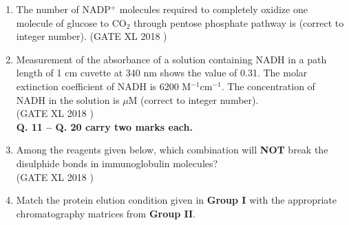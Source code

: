 \documentclass[14pt]{extarticle}
\begin{document}
\begin{flushleft}
\begin{enumerate}[leftmargin=*]
\item The number of NADP$^+$ molecules required to completely oxidize one molecule of glucose to CO$_2$ through pentose phosphate pathway is \underline{\hspace{2cm}} (correct to integer number).
\hfill(GATE XL 2018 )\\


\item Measurement of the absorbance of a solution containing NADH in a path length of 1 cm cuvette at 340 nm shows the value of 0.31. The molar extinction coefficient of NADH is 6200 M$^{-1}$cm$^{-1}$. The concentration of NADH in the solution is \underline{\hspace{2cm}} $\mu$M (correct to integer number).\\[2ex]
\hfill(GATE XL 2018 )\\


\textbf{Q. 11 – Q. 20 carry two marks each.}

\item Among the reagents given below, which combination will \textbf{NOT} break the disulphide bonds in immunoglobulin molecules?\\[2ex]
\hfill(GATE XL 2018 )\\
\begin{enumerate}
\end{enumerate}

\begin{enumerate}
\end{enumerate}

\item Match the protein elution condition given in \textbf{Group I} with the appropriate chromatography matrices from \textbf{Group II}.


\end{enumerate}
\end{flushleft}
\end{document}
